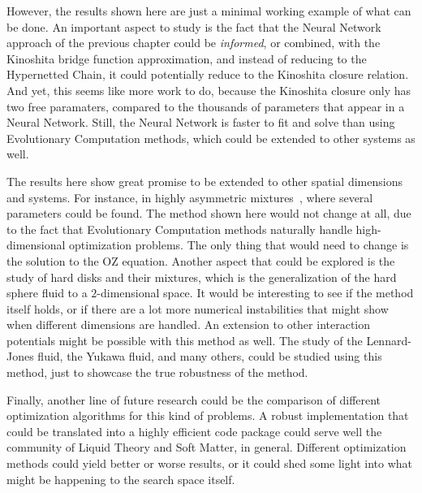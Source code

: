 However, the results shown here are just a minimal working example of what can be done. 
An important aspect to study is the fact that the Neural Network approach of the previous 
chapter could be \emph{informed}, or combined, with the Kinoshita bridge function 
approximation, and instead of reducing to the Hypernetted Chain, it could potentially 
reduce to the Kinoshita closure relation. And yet, this seems like more work to do, because 
the Kinoshita closure only has two free paramaters, compared to the thousands of parameters 
that appear in a Neural Network. Still, the Neural Network is faster to fit and solve than 
using Evolutionary Computation methods, which could be extended to other systems as well.

The results here show great promise to be extended to other spatial dimensions and systems. 
For instance, in highly asymmetric mixtures~\cite{zhouLocalStructureThermodynamics2019}, 
where several parameters could be found. The method shown here would not change at all, due 
to the fact that Evolutionary Computation methods naturally handle high-dimensional 
optimization problems. The only thing that would need to change is the solution to the OZ 
equation. Another aspect that could be explored is the study of hard disks and their 
mixtures, which is the generalization of the hard sphere fluid to a \(2\)-dimensional 
space. It would be interesting to see if the method itself holds, or if there are a lot 
more numerical instabilities that might show when different dimensions are handled.
An extension to other interaction potentials might be possible with this method as well. 
The study of the Lennard-Jones fluid, the Yukawa fluid, and many others, could be studied 
using this method, just to showcase the true robustness of the method.

Finally, another line of future research could be the comparison of different optimization 
algorithms for this kind of problems. A robust implementation that could be translated into 
a highly efficient code package could serve well the community of Liquid Theory and Soft 
Matter, in general. Different optimization methods could yield better or worse results, or 
it could shed some light into what might be happening to the search space itself.